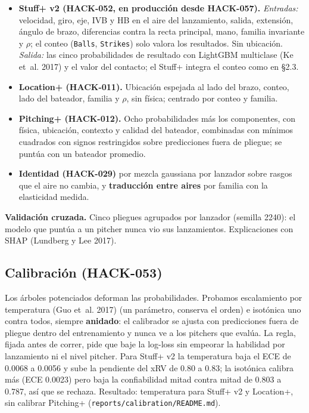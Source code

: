 \documentclass[
  english,
  spanish,
  10pt,
  letterpaper,
]{article}
\providecommand{\tightlist}{%
  \setlength{\itemsep}{0pt}\setlength{\parskip}{0pt}}
\let\diablosTT\texttt
\renewcommand{\texttt}[1]{{\color{gris}\fontsize{8.2}{10}\selectfont\diablosTT{#1}}}
\begin{document}
\begin{itemize}
\tightlist
\item
  \textbf{Stuff+ v2 (HACK-052, en producción desde HACK-057).}
  \emph{Entradas:} velocidad, giro, eje, IVB y HB en el aire del
  lanzamiento, salida, extensión, ángulo de brazo, diferencias contra la
  recta principal, mano, familia invariante y \(\rho\); el conteo
  (\texttt{Balls}, \texttt{Strikes}) solo valora los resultados. Sin
  ubicación. \emph{Salida:} las cinco probabilidades de resultado con
  LightGBM multiclase (Ke et~al. 2017) y el valor del contacto; el
  Stuff+ integra el conteo como en §2.3.
\item
  \textbf{Location+ (HACK-011).} Ubicación espejada al lado del brazo,
  conteo, lado del bateador, familia y \(\rho\), sin física; centrado
  por conteo y familia.
\item
  \textbf{Pitching+ (HACK-012).} Ocho probabilidades más los
  componentes, con física, ubicación, contexto y calidad del bateador,
  combinadas con mínimos cuadrados con signos restringidos sobre
  predicciones fuera de pliegue; se puntúa con un bateador promedio.
\item
  \textbf{Identidad (HACK-029)} por mezcla gaussiana por lanzador sobre
  rasgos que el aire no cambia, y \textbf{traducción entre aires} por
  familia con la elasticidad medida.
\end{itemize}

\textbf{Validación cruzada.} Cinco pliegues agrupados por lanzador
(semilla 2240): el modelo que puntúa a un pitcher nunca vio sus
lanzamientos. Explicaciones con SHAP (Lundberg y Lee 2017).

\subsection{Calibración (HACK-053)}\label{calibraciuxf3n-hack-053}

Los árboles potenciados deforman las probabilidades. Probamos
escalamiento por temperatura (Guo et~al. 2017) (un parámetro, conserva
el orden) e isotónica uno contra todos, siempre \textbf{anidado}: el
calibrador se ajusta con predicciones fuera de pliegue dentro del
entrenamiento y nunca ve a los pitchers que evalúa. La regla, fijada
antes de correr, pide que baje la log-loss sin empeorar la habilidad por
lanzamiento ni el nivel pitcher. Para Stuff+ v2 la temperatura baja el
ECE de 0.0068 a 0.0056 y sube la pendiente del xRV de 0.80 a 0.83; la
isotónica calibra más (ECE 0.0023) pero baja la confiabilidad mitad
contra mitad de 0.803 a 0.787, así que se rechaza. Resultado:
temperatura para Stuff+ v2 y Location+, sin calibrar Pitching+
(\texttt{reports/calibration/README.md}).
\end{document}
